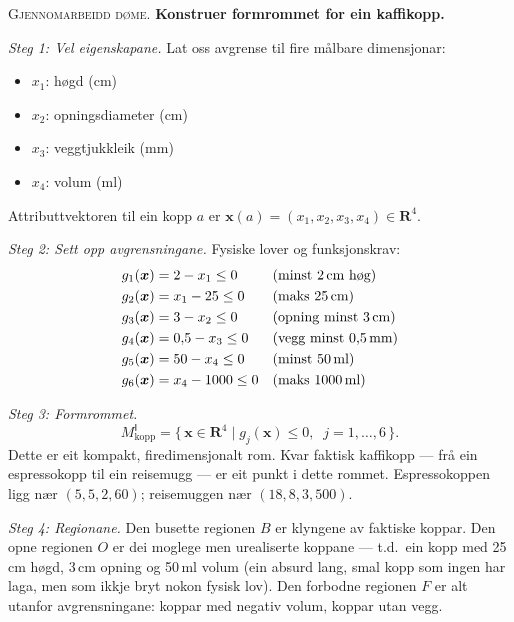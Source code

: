 \documentclass[10pt]{book}
\theoremstyle{definition}
\theoremstyle{plain}
\theoremstyle{remark}
\newenvironment{gjennomgang}%
  {\medskip\noindent\textsc{Gjennomarbeidd d\o me.}\enspace}%
  {\medskip}
\providecommand{\R}{}
\renewcommand{\R}{\mathbf{R}}
\begin{document}
\begin{gjennomgang}
\textbf{Konstruer formrommet for ein kaffikopp.}

\textit{Steg 1: Vel eigenskapane.} Lat oss avgrense til fire m\aa lbare dimensjonar:
\begin{itemize}[nosep]
  \item $x_1$: h\o gd (cm)
  \item $x_2$: opningsdiameter (cm)
  \item $x_3$: veggtjukkleik (mm)
  \item $x_4$: volum (ml)
\end{itemize}
Attributtvektoren til ein kopp $a$ er $\bm{x}(a) = (x_1, x_2, x_3, x_4) \in \R^4$.

\textit{Steg 2: Sett opp avgrensningane.} Fysiske lover og funksjonskrav:
\begin{align*}
  g_1(\bm{x}) &= 2 - x_1 \leq 0 && \text{(minst 2\,cm h\o g)} \\
  g_2(\bm{x}) &= x_1 - 25 \leq 0 && \text{(maks 25\,cm)} \\
  g_3(\bm{x}) &= 3 - x_2 \leq 0 && \text{(opning minst 3\,cm)} \\
  g_4(\bm{x}) &= 0{,}5 - x_3 \leq 0 && \text{(vegg minst 0{,}5\,mm)} \\
  g_5(\bm{x}) &= 50 - x_4 \leq 0 && \text{(minst 50\,ml)} \\
  g_6(\bm{x}) &= x_4 - 1000 \leq 0 && \text{(maks 1000\,ml)}
\end{align*}

\textit{Steg 3: Formrommet.}
\[
  M^{\mathsf{I}}_{\text{kopp}} = \bigl\{\, \bm{x} \in \R^4
    \;\big|\; g_j(\bm{x}) \leq 0,\;\; j = 1, \ldots, 6 \,\bigr\}.
\]
Dette er eit kompakt, firedimensjonalt rom. Kvar faktisk kaffikopp --- fr\aa{} ein espressokopp til ein reisemugg --- er eit punkt i dette rommet. Espressokoppen ligg n\ae r $(5, 5, 2, 60)$; reisemuggen n\ae r $(18, 8, 3, 500)$.

\textit{Steg 4: Regionane.} Den busette regionen $B$ er klyngene av faktiske koppar. Den opne regionen $O$ er dei moglege men urealiserte koppane --- t.d.\ ein kopp med 25\,cm h\o gd, 3\,cm opning og 50\,ml volum (ein absurd lang, smal kopp som ingen har laga, men som ikkje bryt nokon fysisk lov). Den forbodne regionen $F$ er alt utanfor avgrensningane: koppar med negativ volum, koppar utan vegg.
\end{gjennomgang}
\end{document}
